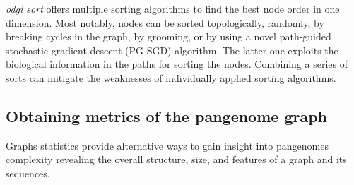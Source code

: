 \documentclass{bioinfo}
\begin{document}

\textit{odgi sort} offers multiple sorting algorithms to find the best node order in one dimension. Most notably, nodes can be sorted topologically, randomly, by breaking cycles in the graph, by grooming, or by using a novel path-guided stochastic gradient descent (PG-SGD) algorithm.
The latter one exploits the biological information in the paths for sorting the nodes.
Combining a series of sorts can mitigate the weaknesses of individually applied sorting algorithms.


\subsection{Obtaining metrics of the pangenome graph}
\label{sec:metrics}



Graphs statistics provide alternative ways to gain insight into pangenomes complexity revealing the overall structure, size, and features of a graph and its sequences.
\end{document}
